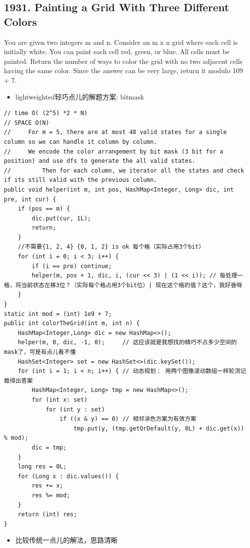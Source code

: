 \documentclass[9pt, b5paaper]{book}
\begin{document}
\subsection{1931. Painting a Grid With Three Different Colors}
\label{sec-1-4-24}
You are given two integers m and n. Consider an m x n grid where each cell is initially white. You can paint each cell red, green, or blue. All cells must be painted.
Return the number of ways to color the grid with no two adjacent cells having the same color. Since the answer can be very large, return it modulo 109 + 7.
\begin{itemize}
\item lightweighted轻巧点儿的解题方案: bitmask
\end{itemize}
\begin{verbatim}
// time O( (2^5) *2 * N)
// SPACE O(N)
//     For m = 5, there are at most 48 valid states for a single column so we can handle it column by column.
//     We encode the color arrangement by bit mask (3 bit for a position) and use dfs to generate the all valid states.
//         Then for each column, we iterator all the states and check if its still valid with the previous column.
public void helper(int m, int pos, HashMap<Integer, Long> dic, int pre, int cur) {
    if (pos == m) {
        dic.put(cur, 1L);
        return;
    }
    //不需要{1, 2, 4} {0, 1, 2} is ok 每个格（实际占用3个bit）
    for (int i = 0; i < 3; i++) {
        if (i == pre) continue; 
        helper(m, pos + 1, dic, i, (cur << 3) | (1 << i)); // 每处理一格，将当前状态左移3位？（实际每个格占用3个bit位）| 现在这个格的值？这个，我好昏呀
    }
}
static int mod = (int) 1e9 + 7;
public int colorTheGrid(int m, int n) {
    HashMap<Integer,Long> dic = new HashMap<>();
    helper(m, 0, dic, -1, 0);     // 这应该就是我想找的精巧不占多少空间的mask了，可是有点儿看不懂
    HashSet<Integer> set = new HashSet<>(dic.keySet());
    for (int i = 1; i < n; i++) { // 动态规划： 用两个图像滚动数组一样轮流记载得出答案
        HashMap<Integer, Long> tmp = new HashMap<>();
        for (int x: set) 
            for (int y : set) 
                if ((x & y) == 0) // 相邻涂色方案为有效方案
                    tmp.put(y, (tmp.getOrDefault(y, 0L) + dic.get(x)) % mod);
        dic = tmp;
    }
    long res = 0L;
    for (Long x : dic.values()) {
        res += x;
        res %= mod;
    }
    return (int) res;
}
\end{verbatim}
\begin{itemize}
\item 比较传统一点儿的解法，思路清晰
\end{itemize}
\end{document}
